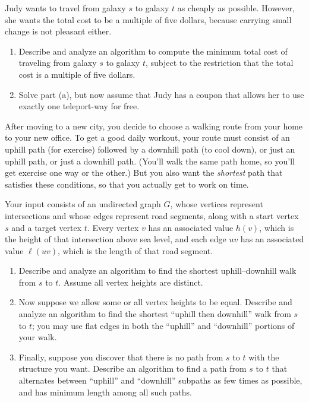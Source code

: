 \begin{exercises}
Judy wants to travel from galaxy $s$ to galaxy $t$ as cheaply as possible.
However, she wants the total cost to be a multiple of five dollars, because carrying small change is not pleasant either.
\begin{enumerate}
\item Describe and analyze an algorithm to compute the minimum total cost of traveling from galaxy $s$ to galaxy $t$, subject to the restriction that the total cost is a multiple of five dollars.
\item Solve part (a), but now assume that Judy has a coupon that allows her to use exactly one teleport-way for free.
\end{enumerate}

\item After moving to a new city, you decide to choose a walking route from your home to your new office.
To get a good daily workout, your route must consist of an uphill path (for exercise) followed by a downhill path (to cool down), or just an uphill path, or just a downhill path.
(You’ll walk the same path home, so you’ll get exercise one way or the other.) But you also want the \textit{shortest} path that satisfies these conditions, so that you actually get to work on time.

Your input consists of an undirected graph $G$, whose vertices represent intersections and whose edges represent road segments, along with a start vertex $s$ and a target vertex $t$.
Every vertex $v$ has an associated value $h(v)$, which is the height of that intersection above sea level, and each edge $uv$ has an associated value $\ell(uv)$, which is the length of that road segment.
\begin{enumerate}
\item Describe and analyze an algorithm to find the shortest uphill–downhill walk from $s$ to $t$.
Assume all vertex heights are distinct.
\item Now suppose we allow some or all vertex heights to be equal.
Describe and analyze an algorithm to find the shortest “uphill then downhill” walk from $s$ to $t$; you may use flat edges in both the “uphill” and “downhill” portions of your walk.
\item Finally, suppose you discover that there is no path from $s$ to $t$ with the structure you want.
Describe an algorithm to find a path from $s$ to $t$ that alternates between “uphill” and “downhill” subpaths as few times as possible, and has minimum length among all such paths.
\end{enumerate}


\end{exercises}
